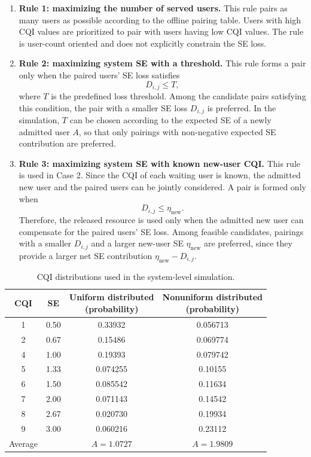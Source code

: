 \begin{enumerate}
    \item \textbf{Rule 1: maximizing the number of served users.} This rule pairs as many users as possible according to the offline pairing table. Users with high CQI values are prioritized to pair with users having low CQI values. The rule is user-count oriented and does not explicitly constrain the SE loss.
    \item \textbf{Rule 2: maximizing system SE with a threshold.} This rule forms a pair only when the paired users' SE loss satisfies
    \begin{equation}
        D_{i,j}\leq T,
    \end{equation}
    where $T$ is the predefined loss threshold. Among the candidate pairs satisfying this condition, the pair with a smaller SE loss $D_{i,j}$ is preferred. In the simulation, $T$ can be chosen according to the expected SE of a newly admitted user $A$, so that only pairings with non-negative expected SE contribution are preferred.
    \item \textbf{Rule 3: maximizing system SE with known new-user CQI.} This rule is used in Case 2. Since the CQI of each waiting user is known, the admitted new user and the paired users can be jointly considered. A pair is formed only when
    \begin{equation}
        \label{eq:rule3-threshold}
        D_{i,j}\leq \eta_{\mathrm{new}}.
    \end{equation}
    Therefore, the released resource is used only when the admitted new user can compensate for the paired users' SE loss. Among feasible candidates, pairings with a smaller $D_{i,j}$ and a larger new-user SE $\eta_{\mathrm{new}}$ are preferred, since they provide a larger net SE contribution $\eta_{\mathrm{new}}-D_{i,j}$.
\end{enumerate}


\begin{table}[t]
\centering
\small
\caption{CQI distributions used in the system-level simulation.}
\label{tab:cqi-distributions}
\begin{tabular}{@{}cccc@{}}
\toprule
CQI & SE & \makecell[c]{Uniform distributed \\ (probability)} & \makecell[c]{Nonuniform distributed \\ (probability)} \\ \midrule
1 & 0.50 & 0.33932 & 0.056713 \\
2 & 0.67 & 0.15486 & 0.069774 \\
4 & 1.00 & 0.19393 & 0.079742 \\
5 & 1.33 & 0.074255 & 0.10155 \\
6 & 1.50 & 0.085542 & 0.11634 \\
7 & 2.00 & 0.071143 & 0.14542 \\
8 & 2.67 & 0.020730 & 0.19934 \\
9 & 3.00 & 0.060216 & 0.23112 \\ \midrule
Average & & $A=1.0727$ & $A=1.9809$ \\
\bottomrule
\end{tabular}
\end{table}

